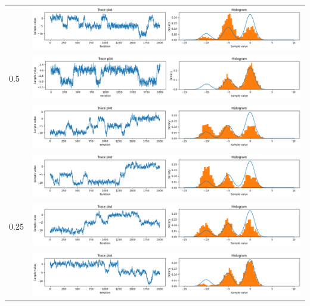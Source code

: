 \documentclass{article}
\theoremstyle{definition}
\newcommand{\1}{\mathbbm{1}}
\begin{document}
{\begin{tabular}{|l|l|}
	\multirow{3}{*}{0.5} & \multicolumn{1}{l}{\includegraphics[width=0.8\linewidth, height=0.1\linewidth, valign=m]{Different variance/0_51.png}} \\
	& \multicolumn{1}{l}{\includegraphics[width=0.8\linewidth, height=0.1\linewidth, valign=m]{Different variance/0_52.png}} \\
	& \multicolumn{1}{l}{\includegraphics[width=0.8\linewidth, height=0.1\linewidth, valign=m]{Different variance/0_53.png}} \\
	\hline
	
	\multirow{3}{*}{0.25} & \multicolumn{1}{l}{\includegraphics[width=0.8\linewidth, height=0.1\linewidth, valign=m]{Different variance/0_251.png}} \\
& \multicolumn{1}{l}{\includegraphics[width=0.8\linewidth, height=0.1\linewidth, valign=m]{Different variance/0_252.png}} \\
& \multicolumn{1}{l}{\includegraphics[width=0.8\linewidth, height=0.1\linewidth, valign=m]{Different variance/0_253.png}} \\
\hline
\end{tabular}
}
\end{document}
